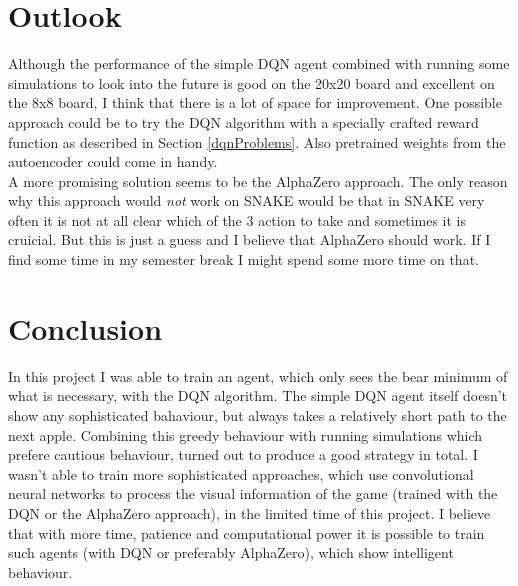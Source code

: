 \documentclass{article}
\begin{document}
\section{Outlook}
\label{outlook}
Although the performance of the simple DQN agent combined with running some simulations to look into the future is good on the 20x20 board and excellent on the 8x8 board, I think that there is a lot of space for improvement. One possible approach could be to try the DQN algorithm with a specially crafted reward function as described in Section \ref{dqnProblems}. Also pretrained weights from the autoencoder could come in handy.\\
A more promising solution seems to be the AlphaZero approach. The only reason why this approach would \emph{not} work on SNAKE would be that in SNAKE very often it is not at all clear which of the 3 action to take and sometimes it is cruicial. But this is just a guess and I believe that AlphaZero should work. If I find some time in my semester break I might spend some more time on that.

\section{Conclusion}
\label{conclusion}
In this project I was able to train an agent, which only sees the bear minimum of what is necessary, with the DQN algorithm. The simple DQN agent itself doesn't show any sophisticated bahaviour, but always takes a relatively short path to the next apple. Combining this greedy behaviour with running simulations which prefere cautious behaviour, turned out to produce a good strategy in total. I wasn't able to train more sophisticated approaches, which use convolutional neural networks to process the visual information of the game (trained with the DQN or the AlphaZero approach), in the limited time of this project. I believe that with more time, patience and computational power it is possible to train such agents (with DQN or preferably AlphaZero), which show intelligent behaviour.






%
\end{document}
